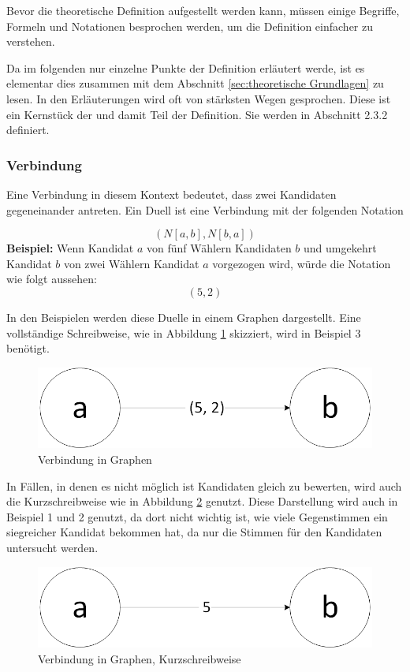 Bevor die theoretische Definition aufgestellt werden kann, müssen einige Begriffe, Formeln und Notationen besprochen werden, um die Definition einfacher zu verstehen.

Da im folgenden nur einzelne Punkte der Definition erläutert werde, ist es elementar dies zusammen mit dem Abschnitt \ref{sec:theoretische Grundlagen} zu lesen. In den Erläuterungen wird oft von \glqq stärksten Wegen\grqq{} gesprochen. Diese ist ein Kernstück der \schulze und damit Teil der Definition. Sie werden in Abschnitt 2.3.2 definiert.


\subsubsection{Verbindung}
\label{sec:verbindung}
Eine Verbindung in diesem Kontext bedeutet, dass zwei Kandidaten gegeneinander antreten. Ein Duell ist eine Verbindung mit der folgenden Notation

\[
(N[a,b],N[b,a])
\]
\textbf{Beispiel:}
Wenn Kandidat $a$ von fünf Wählern Kandidaten $b$ und umgekehrt Kandidat $b$ von zwei Wählern Kandidat $a$ vorgezogen wird, würde die Notation wie folgt aussehen: 
\[
(5,2)
\]

In den Beispielen werden diese Duelle in einem Graphen dargestellt. Eine vollständige Schreibweise, wie in Abbildung \ref{fig:verbindung1} skizziert, wird in Beispiel 3 benötigt.

\begin{figure}[!h]
\centering
\includegraphics[scale=0.5]{Bilder/Definitionab.png}
\caption{Verbindung in Graphen}
\label{fig:verbindung1}
\end{figure}

In Fällen, in denen es nicht möglich ist Kandidaten gleich zu bewerten, wird auch die Kurzschreibweise wie in Abbildung \ref{fig:verbindung2} genutzt. Diese Darstellung wird auch in Beispiel 1 und 2 genutzt, da dort nicht wichtig ist, wie viele Gegenstimmen ein siegreicher Kandidat bekommen hat, da nur die Stimmen für den Kandidaten untersucht werden.

\begin{figure}[!h]
\centering
\includegraphics[scale=0.5]{Bilder/DefinitionShortab.png}
\caption{Verbindung in Graphen, Kurzschreibweise}
\label{fig:verbindung2}
\end{figure}

